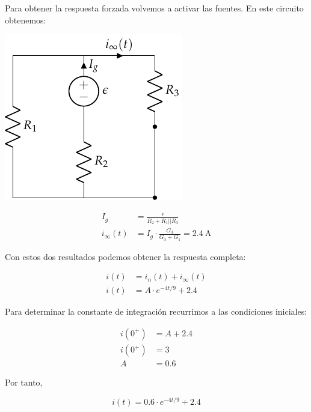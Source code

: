 \documentclass[12pt]{article}
\begin{document}
Para obtener la respuesta forzada volvemos a activar las fuentes. En este circuito obtenemos:

\begin{minipage}{0.3\textwidth}
\includegraphics{figs/FM_4_2_forzada}
\end{minipage}
\begin{minipage}{0.7\textwidth}
  \begin{align*}
    I_g &= \frac{\epsilon}{R_2 + R_1||R_3}\\
    i_\infty(t) &= I_g \cdot \frac{G_3}{G_3 + G_1} = \SI{2.4}{\ampere}
  \end{align*}
\end{minipage}

Con estos dos resultados podemos obtener la respuesta completa:

\begin{align*}
  i(t) &= i_n(t) + i_\infty(t)\\
  i(t) &= A \cdot e^{-4t/9} + 2.4
\end{align*}

Para determinar la constante de integración recurrimos a las condiciones iniciales:

\begin{align*}
  i(0^+) &= A + 2.4\\
  i(0^+) &= 3\\
  A &= 0.6
\end{align*}

Por tanto,

\begin{equation*}
  i(t) = 0.6 \cdot e^{-4t/9} + 2.4
\end{equation*}

\clearpage

\subsection{}
\end{document}
